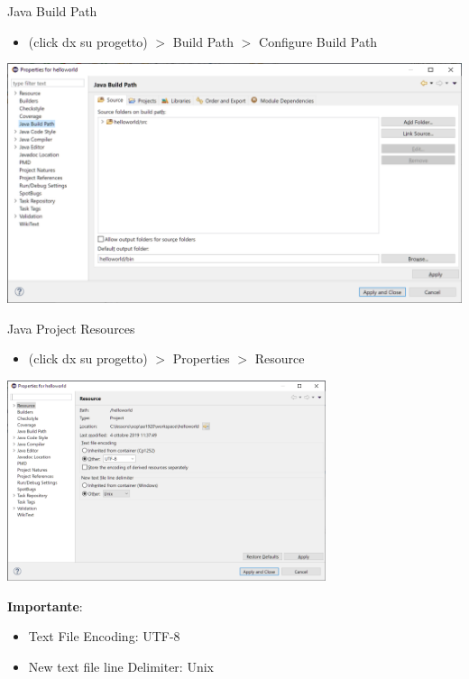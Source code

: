 \documentclass[xcolor=dvipsnames,presentation]{beamer}
\begin{document}
\begin{frame}{Java Build Path}
\begin{itemize}
\item (click dx su progetto) $>$ Build Path $>$ Configure Build Path
\end{itemize}
\begin{center}
\includegraphics[width=\textwidth]{img/eclipse-screenshots/eclipse-ide-05a.png}
\end{center}
\end{frame}

\begin{frame}{Java Project Resources}
\begin{itemize}
\item (click dx su progetto) $>$ Properties $>$ Resource
\end{itemize}
\begin{center}
\includegraphics[width=0.7\textwidth]{img/eclipse-screenshots/eclipse-ide-05b.png}
\end{center}
\textbf{Importante}:
\begin{itemize}
\item Text File Encoding: UTF-8
\item New text file line Delimiter: Unix
\end{itemize}
\end{frame}
\end{document}
